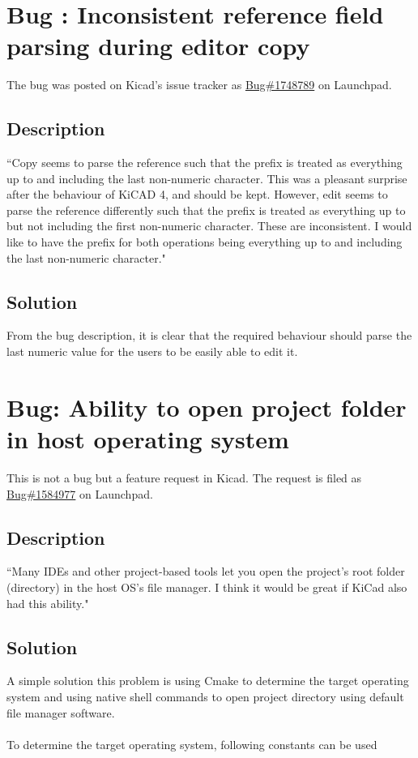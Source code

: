 \documentclass[12pt,a4paper]{report}
\begin{document}
\section{Bug : Inconsistent reference field parsing during editor copy}
The bug was posted on Kicad's issue tracker as \href{https://bugs.launchpad.net/kicad/+bug/1748789}{Bug\#1748789} on Launchpad.
\subsection{Description}
``Copy seems to parse the reference such that the prefix is treated as everything up to and including the last non-numeric character. This was a pleasant surprise after the behaviour of KiCAD 4, and should be kept. However, edit seems to parse the reference differently such that the prefix is treated as everything up to but not including the first non-numeric character. These are inconsistent. I would like to have the prefix for both operations being everything up to and including the last non-numeric character."
\subsection{Solution}
From the bug description, it is clear that the required behaviour should parse the last numeric value for the users to be easily able to edit it.
\section{Bug: Ability to open project folder in host operating system}
This is not a bug but a feature request in Kicad. The request is filed as \href{https://bugs.launchpad.net/kicad/+bug/1584977}{Bug\#1584977} on Launchpad.
\subsection{Description}
``Many IDEs and other project-based tools let you open the project's root folder (directory) in the host OS's file manager. I think it would be great if KiCad also had this ability."
\subsection{Solution}
A simple solution this problem is using Cmake to determine the target operating system and using native shell commands to open project directory using default file manager software.\\
\\
To determine the target operating system, following constants can be used
\end{document}
